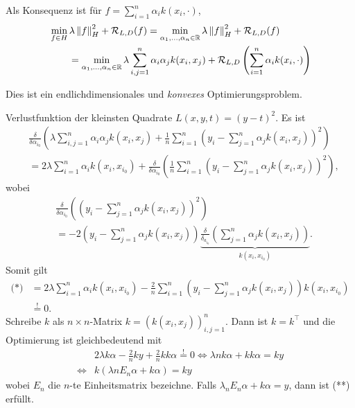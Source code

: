 Als Konsequenz ist für $f=\sum_{i=1}^n\alpha_i k(x_i,\cdot)$,
\begin{align*}
&\min_{f\in H} \lambda\left\|f\right\|_H^2 + \mathcal{R}_{L,D}(f) =
\min_{\alpha_1,\ldots,\alpha_n\in\mathbb{R}} \lambda\left\|f\right\|^2_H + \mathcal{R}_{L,D}(f)\\
&\qquad =
\min_{\alpha_1,\ldots,\alpha_n\in\mathbb{R}} \lambda\sum_{i,j=1}^n \alpha_i\alpha_j
k(x_i,x_j) + \mathcal{R}_{L,D}\left(\sum_{i=1}^n \alpha_i k(x_i,\cdot) \right)
\end{align*}

Dies ist ein endlichdimensionales und \textit{konvexes} Optimierungsproblem.

\begin{bsp*}
Verlustfunktion der kleinsten Quadrate $L(x,y,t) = (y-t)^2$. Es ist
\begin{align*}
&\frac{\delta}{\delta \alpha_{i_0}} \left( 
\lambda \sum_{i,j=1}^n \alpha_i\alpha_j k(x_i,x_j) + \frac{1}{n}\sum_{i=1}^n 
\left(y_i -\sum_{j=1}^n \alpha_j k(x_i,x_j) \right)^2\right)\\
&=
2\lambda \sum_{i=1}^n \alpha_i k(x_i,x_{i_0}) + 
\frac{\delta}{\delta \alpha_{i_0}} \left( 
\frac{1}{n}\sum_{i=1}^n 
\left(y_i -\sum_{j=1}^n \alpha_j k(x_i,x_j) \right)^2\right),\tag{*}
\end{align*}
wobei
\begin{align*}
&\frac{\delta}{\delta \alpha_{i_0}} \left(  
\left(y_i -\sum_{j=1}^n \alpha_j k(x_i,x_j) \right)^2\right)\\
&= -2\left(y_i - \sum_{j=1}^n \alpha_j k(x_i,x_j) \right)
\underbrace{\frac{\delta}{\delta_{a_{i_0}}} \left(\sum_{j=1}^n \alpha_j
k(x_i,x_j)\right)}_{k(x_i,x_{i_0})}.
\end{align*}
Somit gilt
\begin{align*}
\text{(*)} &=
2\lambda \sum_{i=1}^n \alpha_i k(x_i,x_{i_0}) 
 -\frac{2}{n}\sum_{i=1}^n \left(y_i - \sum_{j=1}^n \alpha_j k(x_i,x_j) \right)
k(x_i,x_{i_0})\\
&\overset{!}{=} 0.
\end{align*}
Schreibe $k$ als $n\times n$-Matrix $k=\left(k(x_i,x_j)\right)_{i,j=1}^n$. Dann
ist $k=k^\top$ und die Optimierung ist gleichbedeutend mit
\begin{align*}
&2\lambda k\alpha - \frac{2}{n}ky + \frac{2}{n}kk\alpha \overset{!}{=}0
\Leftrightarrow
\lambda n k \alpha + kk\alpha = ky\\
\Leftrightarrow
&k(\lambda n E_n\alpha + k\alpha) = ky\tag{**}
\end{align*} 
wobei $E_n$ die $n$-te Einheitsmatrix bezeichne. Falls $\lambda_n E_n \alpha +
k\alpha = y$, dann ist (**) erfüllt.


\end{bsp*}
